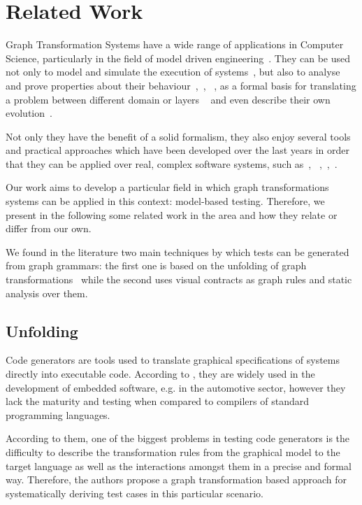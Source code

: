 \chapter{Related Work}\label{ch:related-work}

Graph Transformation Systems have a wide range of applications in Computer Science, particularly in the field of model driven engineering~\cite{modelDriven}. They can be used not only to model and simulate the execution of systems~\cite{Ehrig2009}, but also to analyse and prove properties about their behaviour~\cite{Lambers},~\cite{dissertacaoDoCarinha}, ~\cite{Penneman}, as a formal basis for translating a problem between different domain or layers ~\cite{tripleGraphGrammars} and even describe their own evolution~\cite{Machado2012}.

Not only they have the benefit of a solid formalism, they also enjoy several tools and practical approaches which have been developed over the last years in order that they can be applied over real, complex software systems, such as~\cite{AGG}, ~\cite{Groove},~\cite{Henshin},~\cite{GrGen.Net}.

Our work aims to develop a particular field in which graph transformations systems can be applied in this context: model-based testing. Therefore, we present in the following some related work in the area and how they relate or differ from our own.

We found in the literature two main techniques by which tests can be generated from graph grammars: the first one is based on the unfolding of graph transformations~\cite{Baldan2004} while the second uses visual contracts as graph rules and static analysis over them.

\section{Unfolding}

Code generators are tools used to translate graphical specifications of systems directly into executable code. According to \cite{Baldan2004}, they are widely used in the development of embedded software, e.g. in the automotive sector, however they lack the maturity and testing when compared to compilers of standard programming languages.

According to them, one of the biggest problems in testing code generators is the difficulty to describe the transformation rules from the graphical model to the target language as well as the interactions amongst them in a precise and formal way. Therefore, the authors propose a graph transformation based approach for systematically deriving test cases in this particular scenario.

